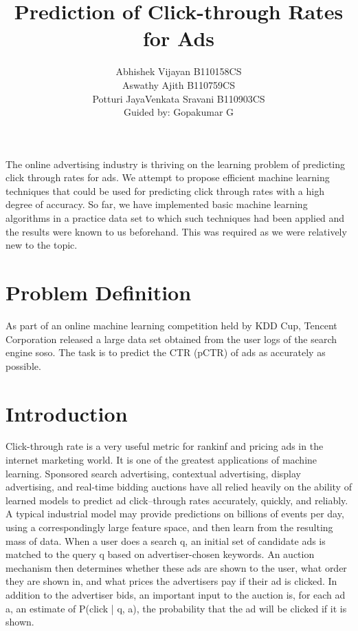 \documentclass[10pt]{article}
\title{Prediction of Click-through Rates for Ads}
\author{ Abhishek Vijayan     B110158CS\\  Aswathy Ajith     B110759CS\\  Potturi JayaVenkata Sravani    B110903CS\\  Guided by: Gopakumar G}
\begin{document}
	
\maketitle
	

\abstract{} 
The online advertising industry is thriving on the learning problem of predicting click through rates for ads. We attempt to propose efficient machine learning techniques that could be used for predicting click through rates with a high degree of accuracy. So far, we have implemented basic machine learning algorithms in a practice data set to which such techniques had been applied and the results were known to us beforehand. This was required as we were relatively new to the topic. 
\section{Problem Definition}
As part of an online machine learning competition held by KDD Cup, Tencent Corporation released a large data set obtained from the user logs of the search engine soso. The task is to predict the CTR (pCTR) of ads as accurately as possible.
\section{Introduction}
Click-through rate is a very useful metric for rankinf and pricing ads in the internet marketing world. It is one of the greatest applications of machine learning. Sponsored search advertising, contextual advertising, display advertising, and real-time bidding auctions have all relied heavily on the ability of learned models to predict ad click–through rates accurately, quickly, and reliably.  A typical industrial model may provide predictions on billions of events per day, using a correspondingly large feature space, and then learn from the resulting mass of data. When a user does a search q, an initial set of candidate ads is matched to the query q based on advertiser-chosen keywords. An auction mechanism then determines whether these ads are shown to the user, what order they are shown in, and what prices the advertisers pay if their ad is clicked. In addition to the advertiser bids, an important input to the auction is, for each ad a, an estimate of P(click | q, a), the probability that the ad will be clicked if it is shown.
\end{document}
